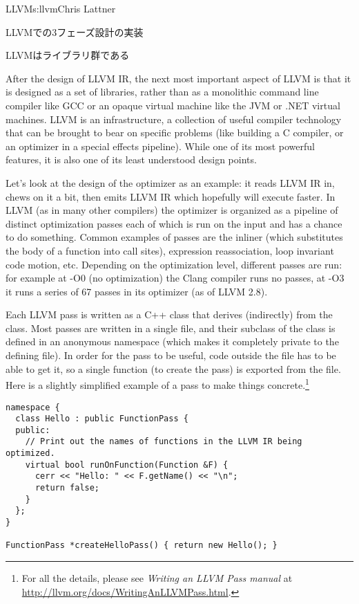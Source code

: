 \begin{aosachapter}{LLVM}{s:llvm}{Chris Lattner}
\begin{aosasect1}{LLVMでの3フェーズ設計の実装}
\begin{aosasect2}{LLVMはライブラリ群である}

After the design of LLVM IR, the next most important
aspect of LLVM is that it is designed as a set of libraries, rather than as a
monolithic command line compiler like GCC or an opaque virtual machine
like the JVM or .NET virtual machines.  LLVM is an
infrastructure, a collection of useful compiler technology that can be
brought to bear on specific problems (like building a C compiler, or
an optimizer in a special effects pipeline).  While one of its most
powerful features, it is also one of its least understood design
points.

Let's look at the design of the optimizer as an example: it reads LLVM
IR in, chews on it a bit, then emits LLVM IR which hopefully will
execute faster.  In LLVM (as in many other compilers) the optimizer is
organized as a pipeline of distinct optimization passes each of which
is run on the input and has a chance to do something.  Common examples
of passes are the inliner (which substitutes the body of a function
into call sites), expression reassociation, loop invariant code
motion, etc.  Depending on the optimization level, different passes
are run: for example at -O0 (no optimization) the Clang compiler runs
no passes, at -O3 it runs a series of 67 passes in its optimizer (as
of LLVM 2.8).

Each LLVM pass is written as a C++ class that derives (indirectly)
from the  class.  Most passes are written in a single
 file, and their subclass of the  class is
defined in an anonymous namespace (which makes it completely private
to the defining file).  In order for the pass to be useful, code
outside the file has to be able to get it, so a single function (to
create the pass) is exported from the file.  Here is a slightly
simplified example of a pass to make things concrete.\footnote{ For
all the details, please see \emph{Writing an LLVM Pass manual} at
\url{http://llvm.org/docs/WritingAnLLVMPass.html}.  }

\begin{verbatim}
namespace {
  class Hello : public FunctionPass {
  public:
    // Print out the names of functions in the LLVM IR being optimized.
    virtual bool runOnFunction(Function &F) {
      cerr << "Hello: " << F.getName() << "\n";
      return false;
    }
  };
}

FunctionPass *createHelloPass() { return new Hello(); }
\end{verbatim}


\end{aosasect2}
\end{aosasect1}
\end{aosachapter}
